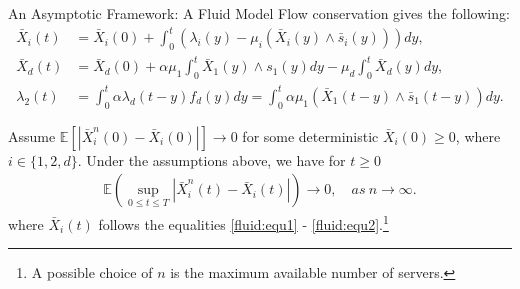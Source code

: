 \documentclass[smaller ,table,usenames,dvipsnames]{beamer}
\newcommand{\?}{\stackrel{?}{=}}
\begin{document}
\begin{frame}{An Asymptotic Framework: A Fluid Model}
Flow conservation gives the following:
\small
\begin{align}
\bar{X}_i(t) &= \bar{X}_i(0) + \int_0^t \left(\lambda_i(y) - \mu_i \left( \bar{X}_i(y)\land \bar{s}_i(y) \right)  \right) dy, \label{fluid:equ1} \\
\bar{X}_d(t) &= \bar{X}_d(0)+ \alpha\mu_1\int_{0}^t \bar{X}_1(y) \wedge {s}_1(y)dy - \mu_d\int_{0}^t \bar{X}_d(y)dy,\label{fluid:orbit}\\
\lambda_2(t) &= \int_0^t \alpha\lambda_d(t-y)f_d(y)dy = \int_0^t \alpha\mu_1\left( \bar{X}_1(t-y)\land \bar{s}_1(t-y) \right)dy.\label{fluid:equ2}
\end{align}
\normalsize 

\begin{theorem}\label{thm:weak_convergence}
	Assume $\mathbb{E}[|\bar{X}_i^n(0) - \bar{X}_i(0)| ] \rightarrow 0$ for some deterministic $\bar{X}_i(0)\geq 0$, where $i\in\{1,2,d\}$. Under the assumptions above, we have for $t\geq 0$
	\begin{align}
	\mathbb{E}\left( \sup\limits_{0\leq t\leq T}|\bar{X}^n_i(t) - \bar{X}_i(t) |  \right)\rightarrow 0, \quad as~n\rightarrow \infty.
	\end{align}	where $\bar{X}_i(t)$ follows the equalities \eqref{fluid:equ1} - \eqref{fluid:equ2}.\footnote{A possible choice of $ n $ is the maximum available number of servers.}
\end{theorem} 
\end{frame}
\end{document}
